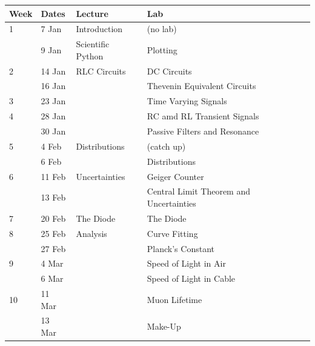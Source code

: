\documentclass[12pt]{article}
\begin{document}
\begin{table}[h!]
\normalsize %
\begin{tabular}{ lllll }
\hline
\textbf{Week} & \textbf{Dates} & \textbf{Lecture} & \textbf{Lab} \\
\hline
1 & 7 Jan & Introduction & (no lab) \\
   & 9 Jan & Scientific Python & Plotting\\
\hline
2 & 14 Jan & RLC Circuits & DC Circuits \\
  & 16 Jan & & Thevenin Equivalent Circuits \\
\hline
3 & 23 Jan & & Time Varying Signals \\
\hline
4 & 28 Jan & & RC amd RL Transient Signals \\
   & 30 Jan &  &  Passive Filters and Resonance \\
\hline
5 & 4 Feb & Distributions & (catch up) \\
   & 6 Feb & & Distributions \\
\hline
6 & 11 Feb & Uncertainties & Geiger Counter \\
   & 13 Feb & & Central Limit Theorem and Uncertainties \\
\hline
7 & 20 Feb & The Diode & The Diode\\
\hline
8 & 25 Feb & Analysis & Curve Fitting \\
   & 27 Feb & & Planck's Constant \\
\hline
9 & 4 Mar & & Speed of Light in Air \\
   & 6 Mar & & Speed of Light in Cable \\
\hline
10 & 11 Mar & & Muon Lifetime\\
   & 13 Mar & & Make-Up \\
\hline
\end{tabular} 
\end{table}
\end{document}
